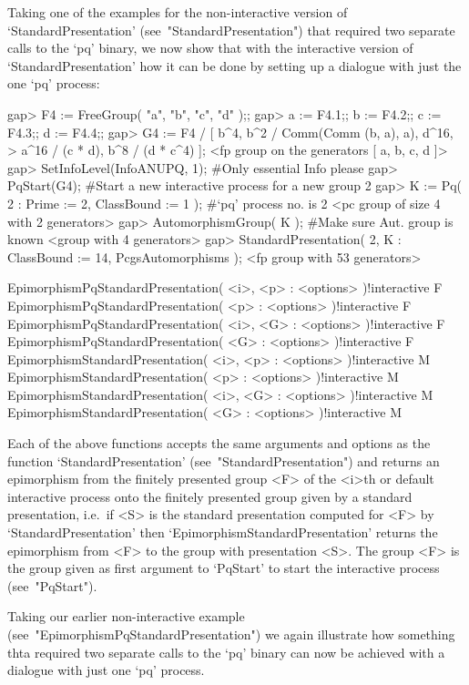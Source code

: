 Taking  one  of  the  examples  for  the   non-interactive   version   of
`StandardPresentation'  (see~"StandardPresentation")  that  required  two
separate calls to the `pq' binary, we now show that with the  interactive
version of `StandardPresentation' how it can be  done  by  setting  up  a
dialogue with just the one `pq' process:

\beginexample
gap> F4 := FreeGroup( "a", "b", "c", "d" );;
gap> a := F4.1;; b := F4.2;; c := F4.3;; d := F4.4;;
gap> G4 := F4 / [ b^4, b^2 / Comm(Comm (b, a), a), d^16,
>                 a^16 / (c * d), b^8 / (d * c^4) ];
<fp group on the generators [ a, b, c, d ]>
gap> SetInfoLevel(InfoANUPQ, 1); #Only essential Info please
gap> PqStart(G4); #Start a new interactive process for a new group
2
gap> K := Pq( 2 : Prime := 2, ClassBound := 1 ); #`pq' process no. is 2
<pc group of size 4 with 2 generators>
gap> AutomorphismGroup( K );     #Make sure Aut. group is known
<group with 4 generators>
gap> StandardPresentation( 2, K : ClassBound := 14, PcgsAutomorphisms );
<fp group with 53 generators>
\endexample

\>EpimorphismPqStandardPresentation( <i>, <p> : <options> )!{interactive} F
\>EpimorphismPqStandardPresentation( <p> : <options> )!{interactive} F
\>EpimorphismPqStandardPresentation( <i>, <G> : <options> )!{interactive} F
\>EpimorphismPqStandardPresentation( <G> : <options> )!{interactive} F
\>EpimorphismStandardPresentation( <i>, <p> : <options> )!{interactive} M
\>EpimorphismStandardPresentation( <p> : <options> )!{interactive} M
\>EpimorphismStandardPresentation( <i>, <G> : <options> )!{interactive} M
\>EpimorphismStandardPresentation( <G> : <options> )!{interactive} M

Each of the above functions accepts the same arguments and options as the
function `StandardPresentation' (see~"StandardPresentation") and  returns
an epimorphism from the finitely presented group  <F>  of  the  <i>th  or
default interactive {\ANUPQ} process onto the  finitely  presented  group
given  by  a  standard  presentation,  i.e.~if  <S>   is   the   standard
presentation   computed   for   <F>   by   `StandardPresentation'    then
`EpimorphismStandardPresentation' returns the epimorphism from <F> to the
group with presentation <S>. The group <F> is the group  given  as  first
argument  to  `PqStart'  to  start  the  interactive   {\ANUPQ}   process
(see~"PqStart").

Taking        our         earlier         non-interactive         example
(see~"EpimorphismPqStandardPresentation")   we   again   illustrate   how
something thta required two separate calls to the `pq' binary can now  be
achieved with a dialogue with just one `pq' process.

